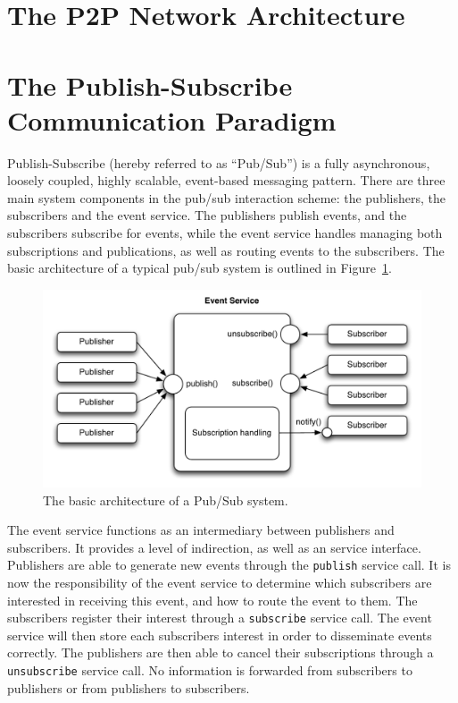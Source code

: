 \section{The P2P Network Architecture}

\section{The Publish-Subscribe Communication Paradigm}

Publish-Subscribe (hereby referred to as ``Pub/Sub'') is a fully
asynchronous, loosely coupled, highly scalable, event-based messaging
pattern. There are three main system components in the pub/sub
interaction scheme: the publishers, the subscribers and the event
service. The publishers publish events, and the subscribers subscribe
for events, while the event service handles managing both subscriptions
and publications, as well as routing events to the subscribers. The
basic architecture of a typical pub/sub system is outlined in
Figure~\ref{fig:pubsubarch}.

\begin{figure}
\centering
\includegraphics[width=\textwidth]{figures/pubsubarch}
\caption{The basic architecture of a Pub/Sub system.}
\label{fig:pubsubarch}
\end{figure}

The event service functions as an intermediary between publishers and
subscribers. It provides a level of indirection, as well as an service
interface. Publishers are able to generate new events through the
\texttt{publish} service call. It is now the responsibility of the
event service to determine which subscribers are interested in receiving
this event, and how to route the event to them. The subscribers register
their interest through a \texttt{subscribe} service call. The event
service will then store each subscribers interest in order to
disseminate events correctly. The publishers are then able to cancel
their subscriptions through a \texttt{unsubscribe} service call. No
information is forwarded from subscribers to publishers or from
publishers to subscribers.

